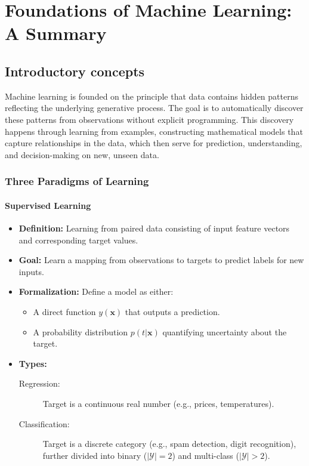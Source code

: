 
\chapter{Foundations of Machine Learning: A Summary}

\section*{Introductory concepts}
Machine learning is founded on the principle that data contains hidden patterns reflecting the underlying generative process. The goal is to automatically discover these patterns from observations without explicit programming. This discovery happens through learning from examples, constructing mathematical models that capture relationships in the data, which then serve for prediction, understanding, and decision-making on new, unseen data.

\subsection*{Three Paradigms of Learning}

\subsubsection*{Supervised Learning}
\begin{itemize}
    \item \textbf{Definition:} Learning from paired data consisting of input feature vectors and corresponding target values.
    \item \textbf{Goal:} Learn a mapping from observations to targets to predict labels for new inputs.
    \item \textbf{Formalization:} Define a model as either:
    \begin{itemize}
        \item A direct function $y(\mathbf{x})$ that outputs a prediction.
        \item A probability distribution $p(t|\mathbf{x})$ quantifying uncertainty about the target.
    \end{itemize}
    \item \textbf{Types:}
    \begin{description}
        \item[Regression:] Target is a continuous real number (e.g., prices, temperatures).
        \item[Classification:] Target is a discrete category (e.g., spam detection, digit recognition), further divided into binary ($|\mathcal{Y}|=2$) and multi-class ($|\mathcal{Y}|>2$).
    \end{description}
\end{itemize}

